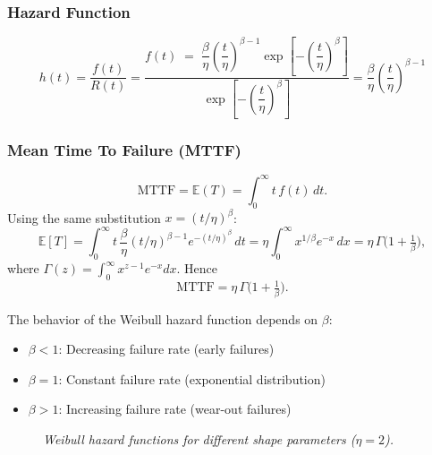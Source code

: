\documentclass[twoside]{book}
\begin{document}
\subsubsection{Hazard Function}
\[
h(t)=\dfrac{f(t)}{R(t)}
= \dfrac{f(t) \;=\; \dfrac{\beta}{\eta}\left( \dfrac{t}{\eta}\right)^{\beta-1}
\exp\left[-\left( \dfrac{t}{\eta}\right)^\beta\right]}
       {\exp\left[-\left( \dfrac{t}{\eta}\right)^\beta\right]}
= \dfrac{\beta}{\eta}\left( \frac{t}{\eta}\right)^{\beta-1}
\]

\subsubsection{Mean Time To Failure (MTTF)}
\[
\text{MTTF} = \mathbb{E}(T) = \int_0^\infty t\,f(t)\,dt.
\]
Using the same substitution \(x=(t/\eta)^\beta\):
\[
\mathbb{E}[T]
= \int_{0}^{\infty} t \,\frac{\beta}{\eta}(t/\eta)^{\beta-1} e^{-(t/\eta)^\beta}\,dt
= \eta \int_{0}^{\infty} x^{1/\beta} e^{-x}\,dx
= \eta\,\Gamma\!\bigl(1 + \tfrac{1}{\beta}\bigr),
\]
where \(\Gamma(z)=\int_0^\infty x^{z-1}e^{-x}dx\).  Hence
\[
\boxed{\text{MTTF} = \eta\,\Gamma\!\bigl(1 + \tfrac{1}{\beta}\bigr).}
\]

The behavior of the Weibull hazard function depends on $\beta$:
\begin{itemize}
\item $\beta < 1$: Decreasing failure rate (early failures)
\item $\beta = 1$: Constant failure rate (exponential distribution)
\item $\beta > 1$: Increasing failure rate (wear-out failures)
\end{itemize}

\begin{figure}[H]
\centering
{}
\caption{\textit{Weibull hazard functions for different shape parameters ($\eta = 2$).}}
\end{figure}
\end{document}
